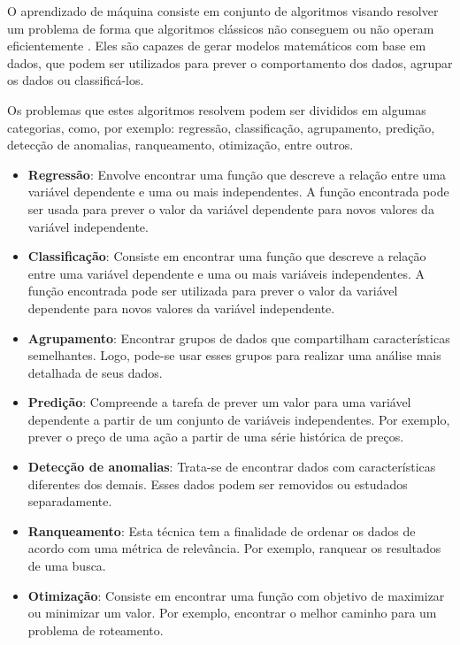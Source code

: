     O aprendizado de máquina consiste em conjunto de algoritmos visando resolver um problema de forma que algoritmos clássicos não conseguem ou não operam eficientemente \cite{monard2003conceitos}. Eles são capazes de gerar modelos matemáticos com base em dados, que podem ser utilizados para prever o comportamento dos dados, agrupar os dados ou classificá-los.

    Os problemas que estes algoritmos resolvem podem ser divididos em algumas categorias, como, por exemplo: regressão, classificação, agrupamento, predição, detecção de anomalias, ranqueamento, otimização, entre outros.

    \begin{itemize}
        \item \textbf{Regressão}: Envolve encontrar uma função que descreve a relação entre uma variável dependente e uma ou mais independentes. A função encontrada pode ser usada para prever o valor da variável dependente para novos valores da variável independente.
        \item \textbf{Classificação}: Consiste em encontrar uma função que descreve a relação entre uma variável dependente e uma ou mais variáveis independentes. A função encontrada pode ser utilizada para prever o valor da variável dependente para novos valores da variável independente.
        \item \textbf{Agrupamento}: Encontrar grupos de dados que compartilham características semelhantes. Logo, pode-se usar esses grupos para realizar uma análise mais detalhada de seus dados.
        \item \textbf{Predição}: Compreende a tarefa de prever um valor para uma variável dependente a partir de um conjunto de variáveis independentes. Por exemplo, prever o preço de uma ação a partir de uma série histórica de preços.
        \item \textbf{Detecção de anomalias}: Trata-se de encontrar dados com características diferentes dos demais. Esses dados podem ser removidos ou estudados separadamente.
        \item \textbf{Ranqueamento}: Esta técnica tem a finalidade de ordenar os dados de acordo com uma métrica de relevância. Por exemplo, ranquear os resultados de uma busca.
        \item \textbf{Otimização}: Consiste em encontrar uma função com objetivo de maximizar ou minimizar um valor. Por exemplo, encontrar o melhor caminho para um problema de roteamento.
    \end{itemize}

